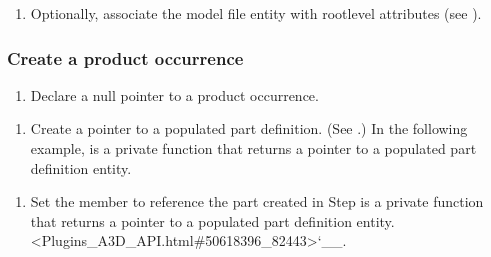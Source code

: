 \documentclass[letterpaper,12pt,english,openany,oneside]{sphinxmanual}
\begin{document}
\begin{sphinxVerbatim}[commandchars=\\\{\}]
    
\end{sphinxVerbatim}
\begin{enumerate}
%
\setcounter{enumi}{4}
\item {} 
Optionally, associate the model file entity with root\sphinxhyphen{}level attributes (see ).

\end{enumerate}


\subsubsection{Create a product occurrence}
\label{\detokenize{Plugins_A3D_API:create-a-product-occurrence}}\begin{enumerate}
%
\item {} 
Declare a null pointer to a product occurrence.

\end{enumerate}

\begin{sphinxVerbatim}[commandchars=\\\{\}]
   
\end{sphinxVerbatim}
\begin{enumerate}
%
\setcounter{enumi}{1}
\item {} 
Create a pointer to a populated part definition. (See .) In the following example,  is a private function that returns a pointer to a populated part definition entity.

\end{enumerate}

\begin{sphinxVerbatim}[commandchars=\\\{\}]
   
\end{sphinxVerbatim}
\begin{enumerate}
%
\setcounter{enumi}{2}
\item {} 
Set the  member to reference the part created in Step  is a private function that returns a pointer to a populated part definition entity. <Plugins\_A3D\_API.html\#50618396\_82443>`\_\_.

\end{enumerate}
\end{document}
